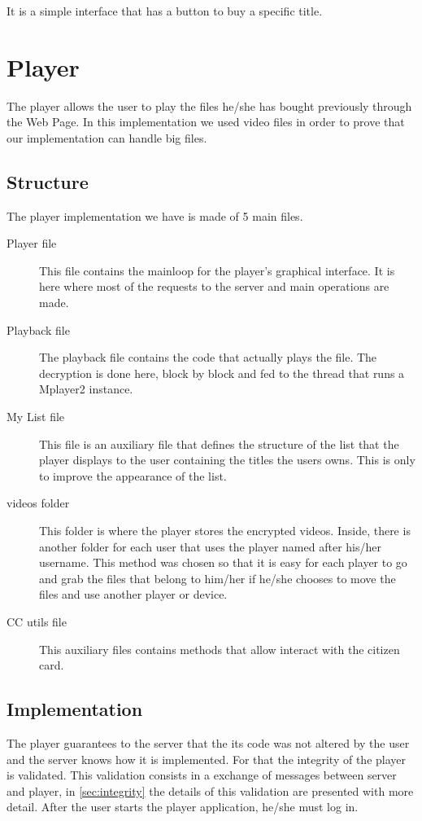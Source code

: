 \documentclass[11pt,a4paper]{report}
\begin{document}
It is a simple interface that has a button to buy a specific title.

\section{Player}
The player allows the user to play the files he/she has bought previously through the Web Page. 
\newline  In this implementation we used video files in order to prove that our implementation can handle big files.

\subsection{Structure}
The player implementation we have is made of 5 main files. 

\begin{description}
  \item[Player file] This file contains the mainloop for the player's graphical interface. It is here where most of the requests to the server and main operations are made.
  \item[Playback file] The playback file contains the code that actually plays the file. The decryption is done here, block by block and fed to the thread that runs a Mplayer2 instance.
  \item[My List file] This file is an auxiliary file that defines the structure of the list that the player displays to the user containing the titles the users owns. This is only to improve the appearance of the list.
  \item[videos folder] This folder is where the player stores the encrypted videos. Inside, there is another folder for each user that uses the player named after his/her username. This method was chosen so that it is easy for each player to go and grab the files that belong to him/her if he/she chooses to move the files and use another player or device.
  \item[CC utils file] This auxiliary files contains methods that allow interact with the citizen card.
\end{description}

\subsection{Implementation}

The player guarantees to the server that the its code was not altered by the user and the server knows how it is implemented. For that the integrity of the player is validated. This validation consists in a exchange of messages between server and player, in \autoref{sec:integrity} the details of this validation are presented with more detail.
After the user starts the player application, he/she must log in. 
\end{document}

